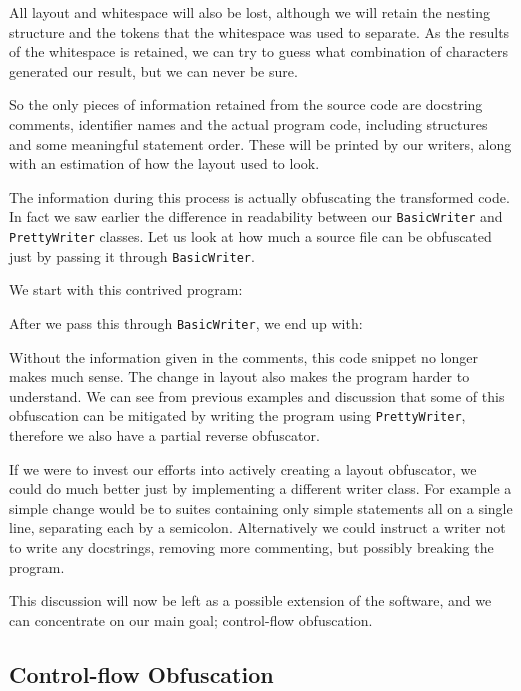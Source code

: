 \documentclass{report}
\begin{document}
All layout and whitespace will also be lost, although we will retain the nesting structure and the tokens that the
whitespace was used to separate. As the results of the whitespace is retained, we can try to guess what combination
of characters generated our result, but we can never be sure.

So the only pieces of information retained from the source code are docstring comments, identifier names and the actual
program code, including structures and some meaningful statement order. These will be printed by our writers, along with
an estimation of how the layout used to look.

The information during this process is actually obfuscating the transformed code. In fact we saw earlier the difference
in readability between our \texttt{BasicWriter} and \texttt{PrettyWriter} classes. Let us look at how much a source file
can be obfuscated just by passing it through \texttt{BasicWriter}.

We start with this contrived program:



After we pass this through \texttt{BasicWriter}, we end up with:



Without the information given in the comments, this code snippet no longer makes much sense. The change in layout also
makes the program harder to understand. We can see from previous examples and discussion that some of this obfuscation
can be mitigated by writing the program using \texttt{PrettyWriter}, therefore we also have a partial reverse obfuscator.

If we were to invest our efforts into actively creating a layout obfuscator, we could do much better just by implementing
a different writer class. For example a simple change would be to suites containing only simple statements all on a single
line, separating each by a semicolon. Alternatively we could instruct a writer not to write any docstrings, removing more
commenting, but possibly breaking the program.

This discussion will now be left as a possible extension of the software, and we can concentrate on our main goal;
control-flow obfuscation.

\subsection{Control-flow Obfuscation}
\end{document}
